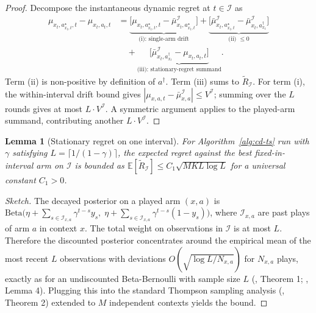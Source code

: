 \documentclass[11pt]{article}
\newtheorem{lemma}[theorem]{Lemma}
\theoremstyle{definition}
\newcommand{\E}{\mathbb{E}}
\newcommand{\Beta}{\mathrm{Beta}}
\begin{document}
\begin{proof}
Decompose the instantaneous dynamic regret at $t \in \mathcal{I}$ as
\begin{align*}
\mu_{x_t, a^\star_{x_t,t}, t} - \mu_{x_t, a_t, t}
&= \underbrace{\big[\mu_{x_t, a^\star_{x_t,t}, t} - \bar{\mu}^{\mathcal{I}}_{x_t, a^\star_{x_t,t}}\big]}_{\text{(i): single-arm drift}}
+ \underbrace{\big[\bar{\mu}^{\mathcal{I}}_{x_t, a^\star_{x_t,t}} - \bar{\mu}^{\mathcal{I}}_{x_t, a^\dagger_{x_t}}\big]}_{\text{(ii) $\leq 0$}}\\
&\quad + \underbrace{\big[\bar{\mu}^{\mathcal{I}}_{x_t, a^\dagger_{x_t}} - \mu_{x_t, a_t, t}\big]}_{\text{(iii): stationary-regret summand}}.
\end{align*}
Term (ii) is non-positive by definition of $a^\dagger$. Term (iii) sums
to $\widetilde{R}_{\mathcal{I}}$. For term (i), the within-interval drift
bound gives $|\mu_{x,a,t} - \bar{\mu}^{\mathcal{I}}_{x,a}| \leq V^{\mathcal{I}}$;
summing over the $L$ rounds gives at most $L \cdot V^{\mathcal{I}}$. A symmetric
argument applies to the played-arm summand, contributing another
$L\cdot V^{\mathcal{I}}$.
\end{proof}

\begin{lemma}[Stationary regret on one interval]
\label{lem:stationary-interval}
For Algorithm~\ref{alg:cd-ts} run with $\gamma$ satisfying
$L = \lceil 1/(1-\gamma) \rceil$, the expected regret against the best
fixed-in-interval arm on $\mathcal{I}$ is bounded as
$\E[\widetilde{R}_{\mathcal{I}}] \leq C_1 \sqrt{M K L \log L}$
for a universal constant $C_1 > 0$.
\end{lemma}

\begin{proof}[Sketch]
The decayed posterior on a played arm $(x,a)$ is
$\Beta\!\big(\eta + \sum_{s \in \mathcal{I}_{x,a}} \gamma^{t-s} y_s,\; \eta + \sum_{s \in \mathcal{I}_{x,a}} \gamma^{t-s} (1-y_s)\big)$,
where $\mathcal{I}_{x,a}$ are past plays of arm $a$ in context $x$. The
total weight on observations in $\mathcal{I}$ is at most $L$. Therefore
the discounted posterior concentrates around the empirical mean of the
most recent $L$ observations with deviations $O(\sqrt{\log L / N_{x,a}})$
for $N_{x,a}$ plays, exactly as for an undiscounted Beta-Bernoulli with
sample size $L$ (\cite{russac2019weighted}, Theorem 1;
\cite{trovo2020sliding}, Lemma 4). Plugging this into the standard
Thompson sampling analysis (\cite{agrawal2013further}, Theorem 2) extended
to $M$ independent contexts yields the bound.
\end{proof}
\end{document}
